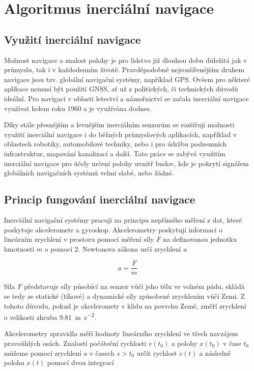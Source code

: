 \chapter{Algoritmus inerciální navigace}
\section{Využití inerciální navigace}
Možnost navigace a znalost polohy je pro lidstvo již dlouhou dobu důležitá jak v průmyslu, tak i v každodenním životě. Pravděpodobně nejrozšířenějším druhem navigace jsou tzv. globální navigační systémy, například \ac{GPS}. Ovšem pro některé aplikace nemusí být použití \ac{GNSS}, ať už z politických, či technických důvodů ideální. Pro navigaci v oblasti letectví a námořnictví se začala inerciální navigace využívat kolem roku 1960 a je využívána dodnes. \cite{Tittertonc2004}

Díky stále přesnějším a levnějším inerciálním senzorům se rozšiřují možnosti využití inerciální navigace i do běžných průmyslových aplikacích, například v oblastech robotiky, automobilové techniky, nebo i pro údržbu podzemních infrastruktur, mapování kanalizací a další. \cite{Tittertonc2004} Tato práce se zabývá využitím inerciální navigace pro účely určení polohy uvnitř budov, kde je pokrytí signálem globálních navigačních systémů velmi slabé, nebo žádné.

\section{Princip fungování inerciální navigace} \label{INSPrinciple}
Inerciální navigační systémy pracují na principu nepřímého měření z dat, které poskytuje akcelerometr a gyroskop.   
Akcelerometry poskytují informaci o lineárním zrychlení v prostoru pomocí měření síly $ F $ na definovanou jednotku hmotnosti $ m $ a pomocí 2. Newtonova zákona určí zrychlení $ a $ \cite{Tittertonc2004}

\begin{equation} \label{eq:2NZ}
a=\frac{F}{m}
\end{equation}

Síla $ F $ představuje síly působící na senzor vůči jeho tělu ve volném pádu, skládá se tedy ze statické (tíhové) a dynamické síly způsobené zrychlením vůči Zemi. \cite{Tittertonc2004}
Z tohoto důvodu, pokud je akcelerometr v klidu na povrchu Země, změří zrychlení o velikosti zhruba \SI{9,81}{\meter\per\second\squared}.

Akcelerometry zpravidla měří hodnoty lineárního zrychlení ve třech navzájem pravoúhlých osách. Znalostí počáteční rychlosti $ v(t_{0}) $ a polohy $ x(t_{0}) $ v čase $ t_{0} $ můžeme pomocí zrychlení $ a $ v časech $ s>t_{0} $ určit rychlost $ v(t) $ a následně polohu $ x(t) $ pomocí dvou integrací \cite{Grewal2013}

